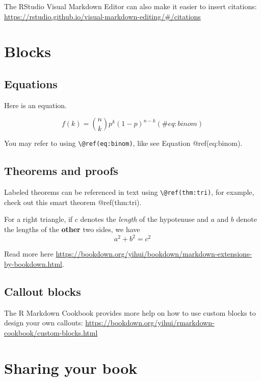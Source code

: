 \documentclass[
]{book}
\begin{document}
The RStudio Visual Markdown Editor can also make it easier to insert
citations:
\url{https://rstudio.github.io/visual-markdown-editing/\#/citations}

\hypertarget{blocks}{%
\chapter{Blocks}\label{blocks}}

\hypertarget{equations}{%
\section{Equations}\label{equations}}

Here is an equation.

\begin{equation} 
  f\left(k\right) = \binom{n}{k} p^k\left(1-p\right)^{n-k}
  (\#eq:binom)
\end{equation}

You may refer to using \texttt{\textbackslash{}@ref(eq:binom)}, like see
Equation @ref(eq:binom).

\hypertarget{theorems-and-proofs}{%
\section{Theorems and proofs}\label{theorems-and-proofs}}

Labeled theorems can be referenced in text using
\texttt{\textbackslash{}@ref(thm:tri)}, for example, check out this
smart theorem @ref(thm:tri).

\leavevmode{}%
For a right triangle, if \(c\) denotes the \emph{length} of the
hypotenuse and \(a\) and \(b\) denote the lengths of the \textbf{other}
two sides, we have \[a^2 + b^2 = c^2\]

Read more here
\url{https://bookdown.org/yihui/bookdown/markdown-extensions-by-bookdown.html}.

\hypertarget{callout-blocks}{%
\section{Callout blocks}\label{callout-blocks}}

The R Markdown Cookbook provides more help on how to use custom blocks
to design your own callouts:
\url{https://bookdown.org/yihui/rmarkdown-cookbook/custom-blocks.html}

\hypertarget{sharing-your-book}{%
\chapter{Sharing your book}\label{sharing-your-book}}
\end{document}
